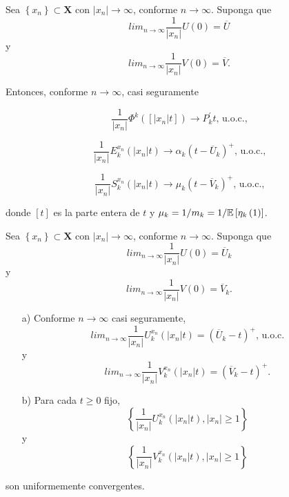 \begin{Lema}\label{Lema4.2}
Sea $\left\{x_{n}\right\}\subset \mathbf{X}$ con
$|x_{n}|\rightarrow\infty$, conforme $n\rightarrow\infty$. Suponga
que
\[lim_{n\rightarrow\infty}\frac{1}{|x_{n}|}U\left(0\right)=\overline{U}\]
y
\[lim_{n\rightarrow\infty}\frac{1}{|x_{n}|}V\left(0\right)=\overline{V}.\]

Entonces, conforme $n\rightarrow\infty$, casi seguramente

\begin{equation}\label{E1.4.2}
\frac{1}{|x_{n}|}\Phi^{k}\left(\left[|x_{n}|t\right]\right)\rightarrow
P_{k}^{'}t\textrm{, u.o.c.,}
\end{equation}

\begin{equation}\label{E1.4.3}
\frac{1}{|x_{n}|}E^{x_{n}}_{k}\left(|x_{n}|t\right)\rightarrow
\alpha_{k}\left(t-\overline{U}_{k}\right)^{+}\textrm{, u.o.c.,}
\end{equation}

\begin{equation}\label{E1.4.4}
\frac{1}{|x_{n}|}S^{x_{n}}_{k}\left(|x_{n}|t\right)\rightarrow
\mu_{k}\left(t-\overline{V}_{k}\right)^{+}\textrm{, u.o.c.,}
\end{equation}

donde $\left[t\right]$ es la parte entera de $t$ y
$\mu_{k}=1/m_{k}=1/\mathbb{E}\left[\eta_{k}\left(1\right)\right]$.
\end{Lema}

\begin{Lema}\label{Lema.4.3}
Sea $\left\{x_{n}\right\}\subset \mathbf{X}$ con
$|x_{n}|\rightarrow\infty$, conforme $n\rightarrow\infty$. Suponga
que
\[lim_{n\rightarrow\infty}\frac{1}{|x_{n}|}U\left(0\right)=\overline{U}_{k}\]
y
\[lim_{n\rightarrow\infty}\frac{1}{|x_{n}|}V\left(0\right)=\overline{V}_{k}.\]
\begin{itemize}
\item[a)] Conforme $n\rightarrow\infty$ casi seguramente,
\[lim_{n\rightarrow\infty}\frac{1}{|x_{n}|}U^{x_{n}}_{k}\left(|x_{n}|t\right)=\left(\overline{U}_{k}-t\right)^{+}\textrm{, u.o.c.}\]
y
\[lim_{n\rightarrow\infty}\frac{1}{|x_{n}|}V^{x_{n}}_{k}\left(|x_{n}|t\right)=\left(\overline{V}_{k}-t\right)^{+}.\]

\item[b)] Para cada $t\geq0$ fijo,
\[\left\{\frac{1}{|x_{n}|}U^{x_{n}}_{k}\left(|x_{n}|t\right),|x_{n}|\geq1\right\}\]
y
\[\left\{\frac{1}{|x_{n}|}V^{x_{n}}_{k}\left(|x_{n}|t\right),|x_{n}|\geq1\right\}\]
\end{itemize}
son uniformemente convergentes.
\end{Lema}

